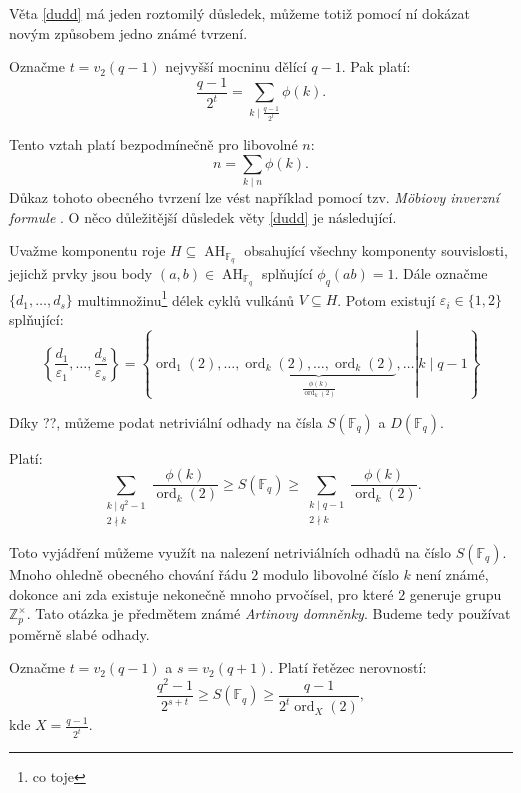 \documentclass[12pt]{report}
\DeclareMathOperator{\ord}{ord}
\DeclareMathOperator{\AH}{AH}
\begin{document}
Věta \ref{dudd} má jeden roztomilý důsledek, můžeme totiž pomocí ní dokázat novým způsobem jedno známé tvrzení.

\begin{dusledek}
Označme $t = v_2(q-1)$ nejvyšší mocninu dělící $q-1$. Pak platí:
$$\frac{q-1}{2^t} = \sum_{k \mid \frac{q-1}{2^t}} \phi(k).$$
\end{dusledek}

Tento vztah platí bezpodmínečně pro libovolné $n$:
\begin{equation}\label{mob}
n = \sum_{k \mid n} \phi(k).
\end{equation}
Důkaz tohoto obecného tvrzení lze vést například pomocí tzv. \textit{M\"{o}biovy inverzní formule} \cite[Ch.3 Thm 2.]{Ireland}. O něco důležitější důsledek věty \ref{dudd} je následující.

\begin{dusledek}
Uvažme komponentu roje $H \subseteq \AH_{\mathbb{F}_q}$ obsahující všechny komponenty souvislosti, jejichž prvky jsou body $(a,b) \in \AH_{\mathbb{F}_q}$ splňující $\phi_q(ab)=1$. Dále označme $\lbrace d_1,\dots,d_s \rbrace$ multimnožinu\footnote{co toje} délek cyklů vulkánů $V \subseteq H$. Potom existují $\varepsilon_i \in \lbrace 1,2 \rbrace$ splňující:
$$\left\lbrace \frac{d_1}{\varepsilon_1},\dots,\frac{d_s}{\varepsilon_s} \right\rbrace = \left\lbrace \left. \ord_1(2),\dots, \underbrace{\ord_k(2),\dots,\ord_k(2)}_{\frac{\phi(k)}{\ord_k(2)}},\dots \right\vert k \mid q-1 \right\rbrace$$
\end{dusledek}

Díky ??, můžeme podat netriviální odhady na čísla $S(\mathbb{F}_q)$ a $D(\mathbb{F}_q)$.

\begin{veta}
Platí:
$$\sum_{\substack{k \mid q^2-1 \\ 2 \nmid k}} \frac{\phi(k)}{\ord_k (2)} \geqslant S(\mathbb{F}_q) \geqslant \sum_{\substack{k \mid q-1 \\ 2 \nmid k}} \frac{\phi(k)}{\ord_k (2)}.$$
\end{veta}


Toto vyjádření můžeme využít na nalezení netriviálních odhadů na číslo $S(\mathbb{F}_q)$. Mnoho ohledně obecného chování řádu $2$ modulo libovolné číslo $k$ není známé, dokonce ani zda existuje nekonečně mnoho prvočísel, pro které $2$ generuje grupu $\mathbb{Z}_{p} ^{\times}$. Tato otázka je předmětem známé \textit{Artinovy domněnky}. Budeme tedy používat poměrně slabé odhady.

\begin{veta}\label{odhad} 
Označme $t = v_2(q-1)$ a $s = v_2(q+1)$. Platí řetězec nerovností:
$$\frac{q^2-1}{2^{s+t}} \geqslant S(\mathbb{F}_q) \geqslant \frac{q-1}{2^t \ord_X ( 2 )},$$
kde $X = \frac{q-1}{2^t}$.
\end{veta}
\end{document}
